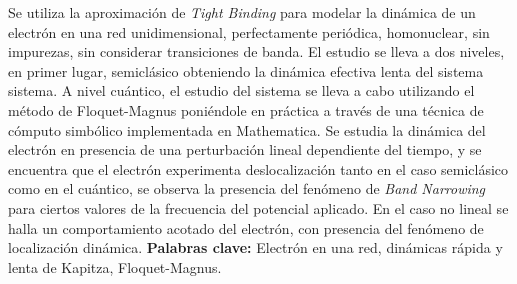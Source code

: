 \begin{resumen}
\setcounter{page}{7}

Se utiliza la aproximación de \textit{Tight Binding} para modelar la dinámica de un electrón en una 
red unidimensional, perfectamente periódica, homonuclear, sin impurezas, sin considerar  
transiciones de banda. El estudio se lleva a dos niveles, en primer lugar, semiclásico 
obteniendo la dinámica efectiva lenta del sistema sistema. A nivel cuántico, el estudio del sistema se lleva a cabo utilizando el método de Floquet-Magnus poniéndole en práctica a través de una técnica de cómputo simbólico implementada en Mathematica. Se estudia la dinámica del electrón en presencia de una perturbación lineal dependiente del tiempo, y se encuentra que el electrón experimenta deslocalización tanto en el caso semiclásico como en el cuántico, se observa la presencia del fenómeno de \textit{Band Narrowing} para ciertos valores de la frecuencia del potencial aplicado. En el caso no lineal se halla un comportamiento acotado del electrón, con presencia del fenómeno de localización dinámica. 
\vfill
\textbf{Palabras clave:} Electrón en una red, dinámicas rápida y lenta de Kapitza, Floquet-Magnus.
\end{resumen}